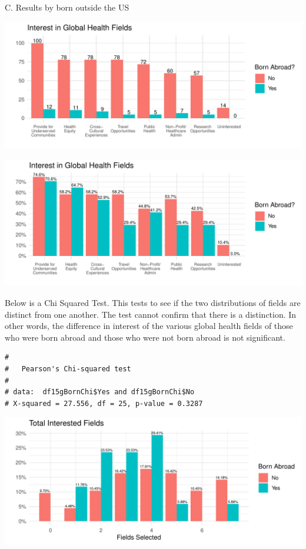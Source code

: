 \documentclass[
  letterpaper,
  DIV=11,
  numbers=noendperiod]{scrartcl}
\begin{document}
\newpage

C. Results by born outside the US

\includegraphics{GlobalHealthQuarto1-5_files/figure-pdf/unnamed-chunk-28-1.pdf}

\includegraphics{GlobalHealthQuarto1-5_files/figure-pdf/unnamed-chunk-29-1.pdf}

\newpage

Below is a Chi Squared Test. This tests to see if the two distributions
of fields are distinct from one another. The test cannot confirm that
there is a distinction. In other words, the difference in interest of
the various global health fields of those who were born abroad and those
who were not born abroad is not significant.

\begin{verbatim}
# 
#   Pearson's Chi-squared test
# 
# data:  df15gBornChi$Yes and df15gBornChi$No
# X-squared = 27.556, df = 25, p-value = 0.3287
\end{verbatim}

\includegraphics{GlobalHealthQuarto1-5_files/figure-pdf/unnamed-chunk-31-1.pdf}
\end{document}
